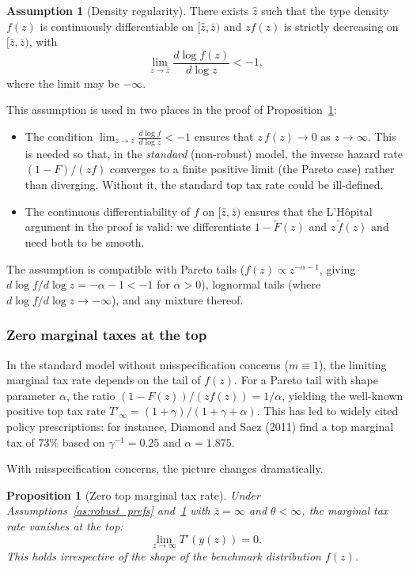 \documentclass[12pt,a4paper]{article}
\theoremstyle{definition}
\newtheorem{assumption}{Assumption}[section]
\theoremstyle{plain}
\newtheorem{proposition}{Proposition}[section]
\theoremstyle{remark}
\newcommand{\zbar}{\bar{z}}
\begin{document}
\begin{assumption}[Density regularity]
\label{as:robust_density}
There exists $\hat{z}$ such that the type density $f(z)$ is continuously differentiable on $[\hat{z}, \zbar)$ and $z f(z)$ is strictly decreasing on $[\hat{z}, \zbar)$, with
\[
  \lim_{z \to \zbar} \frac{d \log f(z)}{d \log z} < -1,
\]
where the limit may be $-\infty$.
\end{assumption}

This assumption is used in two places in the proof of Proposition~\ref{prop:robust_zero_top}:
\begin{itemize}[leftmargin=2em]
  \item The condition $\lim_{z \to \zbar} \frac{d\log f}{d\log z} < -1$ ensures that $z\,f(z) \to 0$ as $z \to \infty$. This is needed so that, in the \emph{standard} (non-robust) model, the inverse hazard rate $(1-F)/(zf)$ converges to a finite positive limit (the Pareto case) rather than diverging. Without it, the standard top tax rate could be ill-defined.
  \item The continuous differentiability of $f$ on $[\hat{z}, \zbar)$ ensures that the L'H\^{o}pital argument in the proof is valid: we differentiate $1 - \widetilde{F}(z)$ and $z\,\widetilde{f}(z)$ and need both to be smooth.
\end{itemize}
The assumption is compatible with Pareto tails ($f(z) \propto z^{-\alpha-1}$, giving $d\log f/d\log z = -\alpha - 1 < -1$ for $\alpha > 0$), lognormal tails (where $d\log f/d\log z \to -\infty$), and any mixture thereof.

\subsubsection{Zero marginal taxes at the top}

In the standard model without misspecification concerns ($m \equiv 1$), the limiting marginal tax rate depends on the tail of $f(z)$. For a Pareto tail with shape parameter $\alpha$, the ratio $(1 - F(z))/(zf(z)) = 1/\alpha$, yielding the well-known positive top tax rate $T'_\infty = (1+\gamma)/(1+\gamma+\alpha)$. This has led to widely cited policy prescriptions: for instance, Diamond and Saez (2011) find a top marginal tax of 73\% based on $\gamma^{-1} = 0.25$ and $\alpha = 1.875$.

With misspecification concerns, the picture changes dramatically.

\begin{proposition}[Zero top marginal tax rate]
\label{prop:robust_zero_top}
Under Assumptions~\ref{as:robust_prefs} and~\ref{as:robust_density} with $\zbar = \infty$ and $\theta < \infty$, the marginal tax rate vanishes at the top:
\[
  \lim_{z \to \infty} T'(y(z)) = 0.
\]
This holds irrespective of the shape of the benchmark distribution $f(z)$.
\end{proposition}
\end{document}
